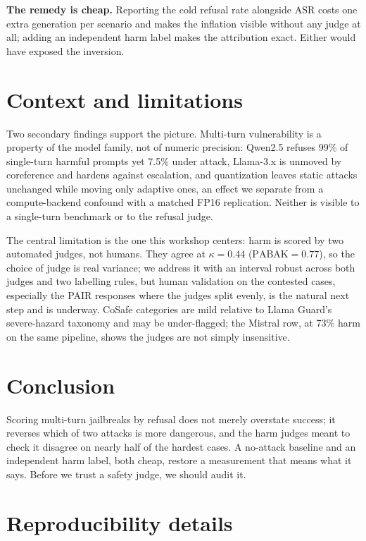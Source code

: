 \documentclass{article}
\begin{document}
\textbf{The remedy is cheap.} Reporting the cold refusal rate alongside ASR costs
one extra generation per scenario and makes the inflation visible without any judge
at all; adding an independent harm label makes the attribution exact. Either would
have exposed the inversion.

\section{Context and limitations}

Two secondary findings support the picture. Multi-turn vulnerability is a property
of the model family, not of numeric precision: Qwen2.5 refuses 99\% of single-turn
harmful prompts yet 7.5\% under attack, Llama-3.x is unmoved by coreference and
hardens against escalation, and quantization leaves static attacks unchanged while
moving only adaptive ones, an effect we separate from a compute-backend confound
with a matched FP16 replication. Neither is visible to a single-turn benchmark or
to the refusal judge.

The central limitation is the one this workshop centers: harm is scored by two
automated judges, not humans. They agree at $\kappa=0.44$ ($\mathrm{PABAK}=0.77$), so the choice of judge
is real variance; we address it with an interval robust across both judges and two
labelling rules, but human validation on the contested cases, especially the PAIR
responses where the judges split evenly, is the natural next step and is underway.
CoSafe categories are mild relative to Llama Guard's severe-hazard taxonomy and may
be under-flagged; the Mistral row, at 73\% harm on the same pipeline, shows the
judges are not simply insensitive.

\section{Conclusion}

Scoring multi-turn jailbreaks by refusal does not merely overstate success; it
reverses which of two attacks is more dangerous, and the harm judges meant to
check it disagree on nearly half of the hardest cases. A no-attack baseline and an
independent harm label, both cheap, restore a measurement that means what it says.
Before we trust a safety judge, we should audit it.

{\small


}

\clearpage
\appendix
\section{Reproducibility details}
\label{app:repro}
\end{document}

